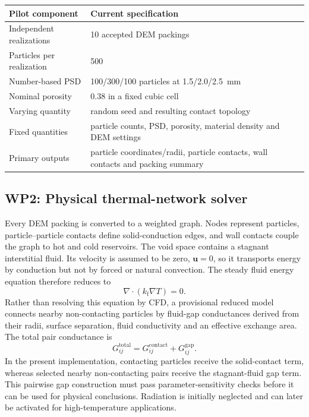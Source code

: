 \documentclass[12pt,a4paper]{article}
\begin{document}
\begin{center}
\begin{tabular}{P{5.4cm}P{7.5cm}}
\toprule
\textbf{Pilot component} & \textbf{Current specification} \\
\midrule
Independent realizations & 10 accepted DEM packings \\
Particles per realization & 500 \\
Number-based PSD & 100/300/100 particles at 1.5/2.0/2.5~mm \\
Nominal porosity & 0.38 in a fixed cubic cell \\
Varying quantity & random seed and resulting contact topology \\
Fixed quantities & particle counts, PSD, porosity, material density and DEM settings \\
Primary outputs & particle coordinates/radii, particle contacts, wall contacts and packing summary \\
\bottomrule
\end{tabular}
\end{center}

\subsection*{WP2: Physical thermal-network solver}

Every DEM packing is converted to a weighted graph. Nodes represent particles,
particle--particle contacts define solid-conduction edges, and wall contacts
couple the graph to hot and cold reservoirs. The void space contains a stagnant
interstitial fluid. Its velocity is assumed to be zero, $\mathbf u=0$, so it
transports energy by conduction but not by forced or natural convection. The
steady fluid energy equation therefore reduces to
\begin{equation}
    \nabla\cdot\left(k_{\mathrm f}\nabla T\right)=0.
\end{equation}
Rather than resolving this equation by CFD, a provisional reduced model
connects nearby non-contacting particles by fluid-gap conductances derived from
their radii, surface separation, fluid conductivity and an effective exchange
area. The total pair conductance is
\begin{equation}
    G_{ij}^{\mathrm{total}}=
    G_{ij}^{\mathrm{contact}}+G_{ij}^{\mathrm{gap}}.
    \label{eq:total_conductance}
\end{equation}
In the present implementation, contacting particles receive the solid-contact
term, whereas selected nearby non-contacting pairs receive the stagnant-fluid
gap term. This pairwise gap construction must pass parameter-sensitivity checks
before it can be used for physical conclusions.
Radiation is initially neglected and can later be activated for high-temperature
applications.
\end{document}

